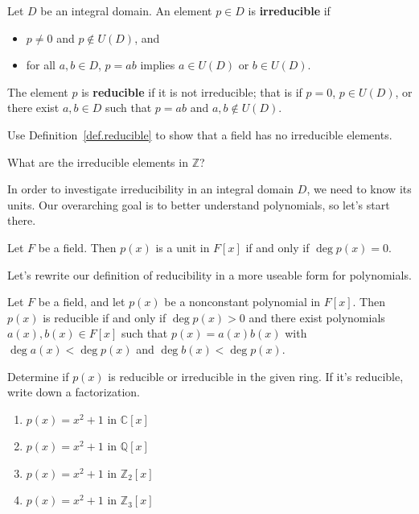 \begin{definition}\label{def.reducible}
Let $D$ be an integral domain. An element $p\in D$ is \textbf{irreducible} if 
\begin{itemize}
\item $p\neq 0$ and $p\notin U(D)$, and
\item for all $a,b\in D$, $p = ab$ implies $a\in U(D)$ or $b\in U(D)$.
\end{itemize} 
The element $p$ is \textbf{reducible} if it is not irreducible; that is if $p=0$, $p\in U(D)$, or there exist $a,b\in D$ such that $p = ab$ and $a,b\notin U(D)$. 
\end{definition}

\begin{problem}
Use Definition~\ref{def.reducible} to show that a field has no irreducible elements.
\end{problem}

\begin{problem}
What are the irreducible elements in $\mathbb{Z}$?
\end{problem}

In order to investigate irreducibility in an integral domain $D$, we need to know its units. Our overarching goal is to better understand polynomials, so let's 
start there. 

\begin{theorem}\label{thm.UnitsFAdjoinx}
Let $F$ be a field. Then $p(x)$ is a unit in $F[x]$ if and only if $\deg p(x) = 0$. 
\end{theorem}

Let's  rewrite our definition of reducibility in a more useable form for polynomials.
\begin{theorem}
Let $F$ be a field, and let $p(x)$ be a nonconstant polynomial in $F[x]$. Then $p(x)$ is reducible if and only if $\deg p(x) > 0$ and there exist polynomials $a(x),b(x) \in F[x]$ such that $p(x) = a(x)b(x)$ with $\deg a(x) <\deg p(x)$ and $\deg b(x) <\deg p(x)$.
\end{theorem}

\begin{problem}
Determine if $p(x)$ is reducible or irreducible in the given ring. If it's reducible, write down a factorization.
\begin{multicols}{2}
\begin{enumerate}
\item $p(x) = x^2+1$ in $\mathbb{C}[x]$
\item $p(x) = x^2+1$ in $\mathbb{Q}[x]$
\item $p(x) = x^2+1$ in $\mathbb{Z}_2[x]$
\item $p(x) = x^2+1$ in $\mathbb{Z}_3[x]$
\end{enumerate}
\end{multicols}
\end{problem}

